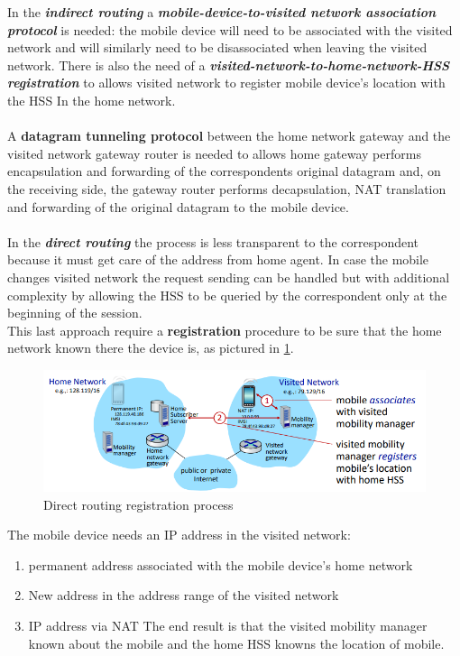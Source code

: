 \documentclass[10pt,a4paper]{report}
\theoremstyle{definition}
\begin{document}
In the \textit{\textbf{indirect routing}} a \textbf{\textit{mobile-device-to-visited network association protocol}} is needed: the mobile device will need to be associated with the visited network and will similarly need to be disassociated when leaving the visited network. There is also the need of a \textit{\textbf{visited-network-to-home-network-HSS registration}} to allows visited network to register mobile device's location with the HSS In the home network.\\\\
A \textbf{datagram tunneling protocol} between the home network gateway and the visited network gateway router is needed to allows home gateway performs encapsulation and forwarding of the correspondents original datagram and, on the receiving side, the gateway router performs decapsulation, NAT translation and forwarding of the original datagram to the mobile device.\\\\
In the \textit{\textbf{direct routing}} the process is less transparent to the correspondent because it must get care of the address from home agent. In case the mobile changes visited network the request sending can be handled but with additional complexity by allowing the HSS to be queried by the correspondent only at the beginning of the session.\\
This last approach require a \textbf{registration} procedure to be sure that the home network known there the device is, as pictured in \ref{registration-proc}.
\begin{figure}[h]
	\centering\includegraphics[scale=0.50]{images/Pasted image 20230322114404.png}
	\caption{Direct routing registration process}
	\label{registration-proc}
\end{figure}

The mobile device needs an IP address in the visited network:
\begin{enumerate}
	\item 
	permanent address associated with the mobile device's home network
	\item 
	New address in the address range of the visited network
	\item 
	IP address via NAT
	The end result is that the visited mobility manager known about the mobile and the home HSS knowns the location of mobile.
\end{enumerate}
\end{document}
